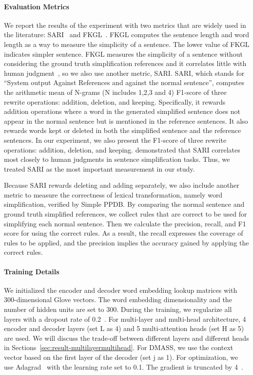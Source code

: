 \documentclass[11pt,a4paper]{article}
\begin{document}
\paragraph{Evaluation Metrics}

We report the results of the experiment with two metrics that are widely used in the literature: SARI~\cite{xu2016optimizing} and FKGL~\cite{kincaid1975derivation}.
FKGL computes the sentence length and word length as a way to measure the simplicity of a sentence. The lower value of FKGL indicates simpler sentence.
FKGL measures the simplicity of a sentence without considering the ground truth simplification references and it correlates little with human judgment~\cite{xu2016optimizing}, so we also use another metric, SARI.
SARI, which stands for ``System output Against References and against the normal sentence'', computes the arithmetic mean of N-grams (N includes 1,2,3 and 4) F1-score of three rewrite operations: addition, deletion, and keeping.
Specifically, it rewards addition operations where a word in the generated simplified sentence does not appear in the normal sentence but is mentioned in the reference sentences. It also rewards words kept or deleted in both the simplified sentence and the reference sentences. In our experiment, we also present the F1-score of three rewrite operations: addition, deletion, and keeping.
\citet{xu2016optimizing} demonstrated that SARI correlates most closely to human judgments in sentence simplification tasks. Thus, we treated SARI as the most important measurement in our study.


Because SARI rewards deleting and adding separately, we also include another metric to measure the correctness of lexical transformation, namely word simplification, verified by Simple PPDB. By comparing the normal sentence and ground truth simplified references, we collect rules that are correct to be used for simplifying each normal sentence. Then we calculate the precision, recall, and F1 score for using the correct rules.  As a result, the recall expresses the coverage of rules to be applied, and the precision implies the accuracy gained by applying the correct rules.

\paragraph{Training Details}

We initialized the encoder and decoder word embedding lookup matrices with 300-dimensional Glove vectors\cite{pennington2014glove}. The word embedding dimensionality and the number of hidden units are set to 300. During the training, we regularize all layers with a dropout rate of 0.2~\cite{srivastava2014dropout}. For multi-layer and multi-head architecture, 4 encoder and decoder layers (set L as 4) and 5 multi-attention heads (set H as 5) are used. We will discuss the trade-off between different layers and different heads in Sections~\ref{sec:result-multilayermultihead}.
For DMASS, we use the context vector based on the first layer of the decoder (set j as 1).
For optimization, we use Adagrad~\cite{duchi2011adaptive} with the learning rate set to 0.1. The gradient is truncated by 4~\cite{pascanu2013difficulty}. 
\end{document}
